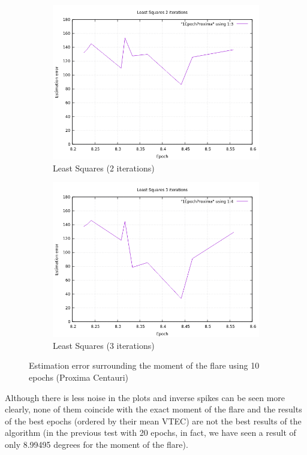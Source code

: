 \begin{figure}[!htb]
\begin{subfigure}[b]{0.5\textwidth}
		\includegraphics[width=\linewidth]{images/resultsStellar/10Epochs1Epoch/proxima/1EpochLS2.png}
		\caption{Least Squares (2 iterations)}
	\end{subfigure}
	\hfill
	\begin{subfigure}[b]{0.5\textwidth}
		\includegraphics[width=\linewidth]{images/resultsStellar/10Epochs1Epoch/proxima/1EpochLS3.png}
		\caption{Least Squares (3 iterations)}
	\end{subfigure}
	\caption{Estimation error surrounding the moment of the flare using 10 epochs (Proxima Centauri)}
	\label{fig:proximaCentauri1Epoch10}
\end{figure}

Although there is less noise in the plots and inverse spikes can be seen more clearly, none of them coincide with the exact moment of the flare and the results of the best epochs (ordered by their mean VTEC) are not the best results of the algorithm (in the previous test with 20 epochs, in fact, we have seen a result of only 8.99495 degrees for the moment of the flare).

